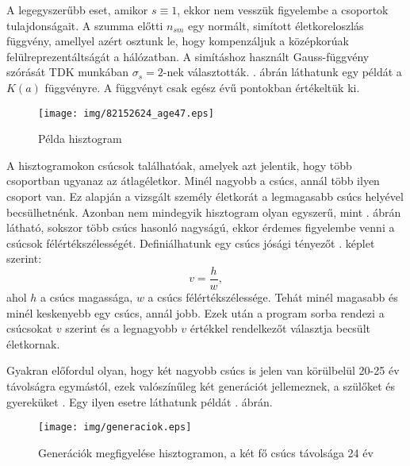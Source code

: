 \documentclass[12pt]{article}
\begin{document}
A legegyszerűbb eset, amikor $s\equiv 1$, ekkor nem vesszük figyelembe a csoportok tulajdonságait.
A szumma előtti $n_{sm}$ egy normált, simított életkoreloszlás függvény, amellyel azért osztunk le, hogy kompenzáljuk a középkorúak felülreprezentáltságát a hálózatban.
A simításhoz használt Gauss-függvény szórását  TDK munkában $\sigma_s=2$-nek választották. . ábrán láthatunk egy példát a $K(a)$ függvényre. A függvényt csak egész évű pontokban értékeltük ki.
\begin{figure}[H]
	\centering
	\texttt{[image: img/82152624\_age47.eps]}
	\caption{Példa hisztogram} %
	\label{hisztogram_pelda}
\end{figure}
A hisztogramokon csúcsok találhatóak, amelyek azt jelentik, hogy több csoportban ugyanaz az átlagéletkor. Minél nagyobb a csúcs, annál több ilyen csoport van. Ez alapján a vizsgált személy életkorát a legmagasabb csúcs helyével becsülhetnénk. Azonban nem mindegyik hisztogram olyan egyszerű, mint . ábrán látható, sokszor több csúcs hasonló nagyságú, ekkor érdemes figyelembe venni a csúcsok félértékszélességét. Definiálhatunk egy csúcs jósági tényezőt . képlet szerint:
\begin{equation} \label{csucs_josag}
	v = \frac{h}{w},
\end{equation}
ahol $h$ a csúcs magassága, $w$ a csúcs félértékszélessége. Tehát minél magasabb és minél keskenyebb egy csúcs, annál jobb. Ezek után a program sorba rendezi a csúcsokat $v$ szerint és a legnagyobb $v$ értékkel rendelkezőt választja becsült életkornak.

Gyakran előfordul olyan, hogy két nagyobb csúcs is jelen van körülbelül 20-25 év távolságra egymástól, ezek valószínűleg két generációt jellemeznek, a szülőket és gyereküket \cite{palchykov2012sex}. Egy ilyen esetre láthatunk példát . ábrán.
\begin{figure}[H]
	\centering
	\texttt{[image: img/generaciok.eps]}
	\caption{Generációk megfigyelése hisztogramon, a két fő csúcs távolsága 24 év}
	\label{generaciok}
\end{figure}

\iffalse
Azt is meg kell említenünk, hogy a hisztogram simítása miatt a csúcs helye eltolódhat, ha a csúcs egyik oldalán sokkal több csoport van, mint a másikon.
\begin{figure}[H]
	\centering
	\texttt{[image: img/]}
\end{figure}
\fi
\end{document}
